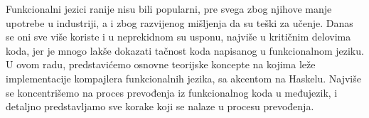 \abstract
	Funkcionalni jezici ranije nisu bili popularni, pre svega zbog njihove manje upotrebe u industriji, a i zbog razvijenog mišljenja
	da su teški za učenje. Danas se oni sve više koriste i u neprekidnom su usponu, najviše u kritičnim delovima koda, 
	jer je mnogo lakše dokazati tačnost koda napisanog u funkcionalnom jeziku. U ovom radu, predstavićemo osnovne teorijske koncepte
	na kojima leže implementacije kompajlera funkcionalnih jezika, sa akcentom na Haskelu. Najviše se koncentrišemo na 
	proces prevođenja iz funkcionalnog koda u međujezik, i detaljno predstavljamo sve korake koji se nalaze u procesu prevođenja.